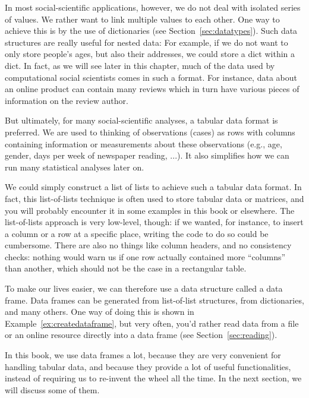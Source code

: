 In most social-scientific applications, however, we do not deal with isolated series of values. We rather want to link multiple values to each other. One way to achieve this is by the use of dictionaries (see Section~\ref{sec:datatypes}).
Such data structures are really useful for nested data:
For example, if we do not want to only store people's ages, but also their addresses,
we could store a dict within a dict.
In fact, as we will see later in this chapter, much of the data used by computational social scientists comes in such a format.
For instance, data about an online product can contain many reviews which in turn have various pieces of information on the review author.

But ultimately, for many social-scientific analyses, a tabular data format is preferred.
We are used to thinking of observations (cases) as rows with columns containing information or measurements about these observations (e.g., age, gender, days per week of newspaper reading, ...). It also simplifies how we can run many statistical analyses later on.

We could simply construct a list of lists to achieve such a tabular data format.
In fact, this list-of-lists technique is often used to store tabular data or matrices, and you will probably encounter it in some examples in this book or elsewhere. The list-of-lists approach is very low-level, though: if we wanted, for instance, to insert a column or a row at a specific place, writing the code to do so could be cumbersome. There are also no things like column headers, and no consistency checks: nothing would warn us if one row actually contained more ``columns'' than another, which should not be the case in a rectangular table.

To make our lives easier, we can therefore use a data structure called a data frame.
Data frames can be generated from list-of-list structures, from dictionaries, and many others.
One way of doing this is shown in Example~\ref{ex:createdataframe}, but very often, you'd rather read data from a file or an online resource directly into a data frame (see Section~\ref{sec:reading}).


In this book, we use data frames a lot, because they are very convenient for handling tabular data, and because they provide a lot of useful functionalities, instead of requiring us to re-invent the wheel all the time. In the next section, we will discuss some of them.

